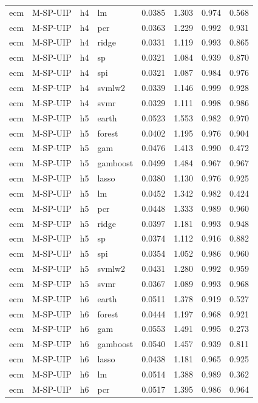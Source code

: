 \begin{ThreePartTable}
\begin{longtable}[t]{llclcccc}
ecm & M-SP-UIP & h4 & lm & 0.0385 & 1.303 & 0.974 & 0.568\\
ecm & M-SP-UIP & h4 & pcr & 0.0363 & 1.229 & 0.992 & 0.931\\
ecm & M-SP-UIP & h4 & ridge & 0.0331 & 1.119 & 0.993 & 0.865\\
ecm & M-SP-UIP & h4 & sp & 0.0321 & 1.084 & 0.939 & 0.870\\
ecm & M-SP-UIP & h4 & spi & 0.0321 & 1.087 & 0.984 & 0.976\\
ecm & M-SP-UIP & h4 & svmlw2 & 0.0339 & 1.146 & 0.999 & 0.928\\
ecm & M-SP-UIP & h4 & svmr & 0.0329 & 1.111 & 0.998 & 0.986\\
\addlinespace
ecm & M-SP-UIP & h5 & earth & 0.0523 & 1.553 & 0.982 & 0.970\\
ecm & M-SP-UIP & h5 & forest & 0.0402 & 1.195 & 0.976 & 0.904\\
ecm & M-SP-UIP & h5 & gam & 0.0476 & 1.413 & 0.990 & 0.472\\
ecm & M-SP-UIP & h5 & gamboost & 0.0499 & 1.484 & 0.967 & 0.967\\
ecm & M-SP-UIP & h5 & lasso & 0.0380 & 1.130 & 0.976 & 0.925\\
ecm & M-SP-UIP & h5 & lm & 0.0452 & 1.342 & 0.982 & 0.424\\
ecm & M-SP-UIP & h5 & pcr & 0.0448 & 1.333 & 0.989 & 0.960\\
ecm & M-SP-UIP & h5 & ridge & 0.0397 & 1.181 & 0.993 & 0.948\\
ecm & M-SP-UIP & h5 & sp & 0.0374 & 1.112 & 0.916 & 0.882\\
ecm & M-SP-UIP & h5 & spi & 0.0354 & 1.052 & 0.986 & 0.960\\
ecm & M-SP-UIP & h5 & svmlw2 & 0.0431 & 1.280 & 0.992 & 0.959\\
ecm & M-SP-UIP & h5 & svmr & 0.0367 & 1.089 & 0.993 & 0.968\\
\addlinespace
ecm & M-SP-UIP & h6 & earth & 0.0511 & 1.378 & 0.919 & 0.527\\
ecm & M-SP-UIP & h6 & forest & 0.0444 & 1.197 & 0.968 & 0.921\\
ecm & M-SP-UIP & h6 & gam & 0.0553 & 1.491 & 0.995 & 0.273\\
ecm & M-SP-UIP & h6 & gamboost & 0.0540 & 1.457 & 0.939 & 0.811\\
ecm & M-SP-UIP & h6 & lasso & 0.0438 & 1.181 & 0.965 & 0.925\\
ecm & M-SP-UIP & h6 & lm & 0.0514 & 1.388 & 0.989 & 0.362\\
ecm & M-SP-UIP & h6 & pcr & 0.0517 & 1.395 & 0.986 & 0.964\\

\end{longtable}
\end{ThreePartTable}
